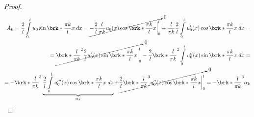 \documentclass[../main.tex]{subfiles}
\begin{document}
\begin{proof}
\begin{align*}
	A_k = \dfrac{2}{l}\int\limits_{0}^{l}u_0\sin \brk*{\dfrac{\pi k}{l}x}\;dx = \cancelto{0}{-\dfrac{2}{l}\dfrac{l}{\pi k}u_0(x)\cos \brk*{\dfrac{\pi k}{l}x}\biggr|_0^l} + \dfrac{l}{\pi k}\dfrac{2}{l}\int\limits_0^l u_0'(x) \cos \brk*{\dfrac{\pi k}{l}x}\;dx = \\ = \cancelto{0}{\brk*{\dfrac{l}{\pi k}}^2 \dfrac{2}{l}u_0'(x)\sin \brk*{\dfrac{\pi k}{l}x}\biggr|_0^l} -  \dfrac{2}{l}\brk*{\dfrac{l}{\pi k}}^2 \int\limits_0^l u_0''(x)\sin \brk*{\dfrac{\pi k}{l} x}\;dx = \\ = - \brk*{\dfrac{l}{\pi k}}^3 \underbrace{\dfrac{2}{l} \int\limits_0^l u_0'''(x)\cos \brk*{\dfrac{\pi k}{l}x}\;dx}_{\alpha_k} + \cancelto{0}{\dfrac{2}{l}\brk*{\dfrac{l}{\pi k}}^3u_0''(x)\cos \brk*{\dfrac{\pi k}{l}x}\biggr|_0^l} = - \brk*{\dfrac{l}{\pi k}}^3 \alpha_k
\end{align*}


\end{proof}
\end{document}
